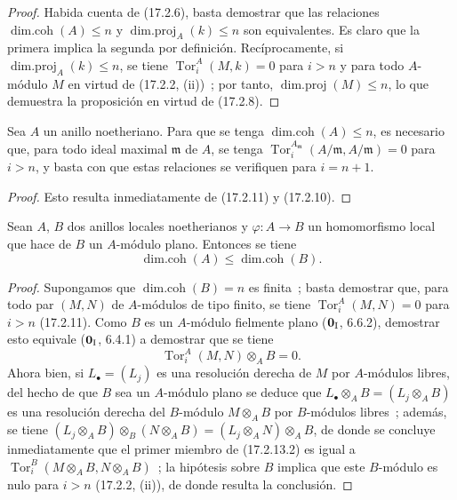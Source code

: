\begin{proof}
Habida cuenta de (17.2.6), basta demostrar que las relaciones
$\operatorname{dim.coh}(A)\leq n$ y
$\operatorname{dim.proj}_A(k)\leq n$ son equivalentes. Es claro que la
primera implica la segunda por definición. Recíprocamente, si
$\operatorname{dim.proj}_A(k)\leq n$, se tiene
$\operatorname{Tor}^A_i(M,k)=0$ para $i>n$ y para todo $A$-módulo $M$ en
virtud de (17.2.2, (ii))~; por tanto, $\operatorname{dim.proj}(M)\leq n$, lo que
demuestra la proposición en virtud de (17.2.8).
\end{proof}

\begin{corollary}[17.2.12]
\label{0.17.2.12-es}
Sea $A$ un anillo noetheriano. Para que se tenga
$\operatorname{dim.coh}(A)\leq n$, es necesario que, para todo ideal
maximal $\mathfrak{m}$ de $A$, se tenga
$\operatorname{Tor}^{A_{\mathfrak{m}}}_i(A/\mathfrak{m},A/\mathfrak{m})=0$
para $i>n$, y basta con que estas relaciones se verifiquen para $i=n+1$.
\end{corollary}

\begin{proof}
Esto resulta inmediatamente de (17.2.11) y (17.2.10).
\end{proof}

\begin{proposition}[17.2.13]
\label{0.17.2.13-es}
Sean $A$, $B$ dos anillos locales noetherianos y
$\varphi:A\longrightarrow B$ un homomorfismo local que hace de $B$ un
$A$-módulo plano. Entonces se tiene
\begin{equation}
\label{0.17.2.13.1-es}
\tag{17.2.13.1}
  \operatorname{dim.coh}(A)\leq\operatorname{dim.coh}(B).
\end{equation}
\end{proposition}

\begin{proof}
Supongamos que $\operatorname{dim.coh}(B)=n$ es finita~; basta demostrar
que, para todo par $(M,N)$ de $A$-módulos de tipo finito, se tiene
$\operatorname{Tor}^A_i(M,N)=0$ para $i>n$ (17.2.11). Como $B$ es un
$A$-módulo fielmente plano ($\mathbf 0_{\rm I}$, 6.6.2), demostrar esto equivale
($\mathbf{0}_{\rm I}$, 6.4.1) a demostrar que se tiene
\begin{equation}
\label{0.17.2.13.2-es}
\tag{17.2.13.2}
  \operatorname{Tor}^A_i(M,N)\otimes_A B=0.
\end{equation}
Ahora bien, si $L_\bullet=(L_j)$ es una resolución derecha de $M$ por $A$-módulos
libres, del hecho de que $B$ sea un $A$-módulo plano se deduce que
$L_\bullet\otimes_A B=(L_j\otimes_A B)$ es una resolución derecha del
$B$-módulo $M\otimes_A B$ por $B$-módulos libres~; además, se tiene
$(L_j\otimes_A B)\otimes_B(N\otimes_A B)
=(L_j\otimes_A N)\otimes_A B$, de donde se concluye inmediatamente que el primer miembro
de (17.2.13.2) es igual a
$\operatorname{Tor}^B_i(M\otimes_A B,N\otimes_A B)$~; la hipótesis sobre $B$
implica que este $B$-módulo es nulo para $i>n$ (17.2.2, (ii)), de donde resulta la
conclusión.
\end{proof}

